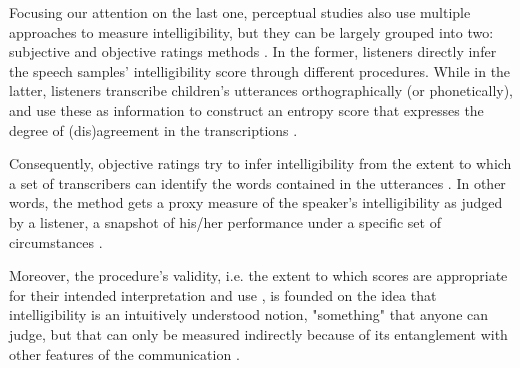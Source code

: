 \begin{comment}	
	
	Based on their description, it seems that perceptual are more subjective than acoustic studies, as they do not rely on "objective" measurements, i.e. time duration, wave amplitude, among others, available in the former. However, for the case of SI, there are objective and subjective assessment methodologies.
		
\end{comment}

Focusing our attention on the last one, perceptual studies also use multiple approaches to measure intelligibility, but they can be largely grouped into two: subjective and objective ratings methods \citep{Hustad_et_al_2020}. In the former, listeners directly infer the speech samples' intelligibility score through different procedures. While in the latter, listeners transcribe children's utterances orthographically (or phonetically), and use these as information to construct an entropy score that expresses the degree of (dis)agreement in the transcriptions \citep{Boonen_et_al_2021, Shannon_1948}. 

Consequently, objective ratings try to infer intelligibility from the extent to which a set of transcribers can identify the words contained in the utterances \citep{Boonen_et_al_2021}. In other words, the method gets a proxy measure of the speaker's intelligibility as judged by a listener, a snapshot of his/her performance under a specific set of circumstances \citep{Hustad_et_al_2020}. 

Moreover, the procedure's validity, i.e. the extent to which scores are appropriate for their intended interpretation and use \citep{Lesterhuis_2018, Trochim_2022}, is founded on the idea that intelligibility is an intuitively understood notion, "something" that anyone can judge, but that can only be measured indirectly because of its entanglement with other features of the communication \citep{Guilford_1954, Stevens_1946}.

\begin{comment}
	
	As the literature suggests, objective rating procedures produce more valid\footnote{validity is understood as the extent to which scores are appropriate for their intended interpretation and use \citep{Lesterhuis_2018, Trochim_2022}.} and reliable\footnote{reliability is though as the extend to which a measure would give us the same result over and over again \citep{Trochim_2022}, i.e. measure something, free from error, in a consistent way.} scores than any other available procedure \citep{Boonen_et_al_2021, Faes_et_al_2021}, as the method does not hinge in the use or production of a \textit{subjective rating scale}, i.e. a scale based on a personal perception of the child's intelligibility.
	
\end{comment}

